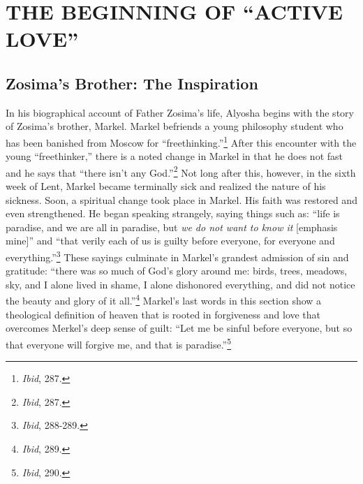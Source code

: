 \chapter{THE BEGINNING OF ``ACTIVE LOVE''}
\section{Zosima's Brother: The Inspiration}
In his biographical account of Father Zosima's life, Alyosha begins with the story of Zosima's brother, Markel. Markel befriends a young philosophy student who has been banished from Moscow for ``freethinking.''\footnote{\emph{Ibid}, 287.} After this encounter with the young ``freethinker,'' there is a noted change in Markel in that he does not fast and he says that ``there isn't any God.''\footnote{\emph{Ibid}, 287.} Not long after this, however, in the sixth week of Lent, Markel became terminally sick and realized the nature of his sickness. Soon, a spiritual change took place in Markel. His faith was restored and even strengthened. He began speaking strangely, saying things such as: ``life is paradise, and we are all in paradise, but \emph{we do not want to know it} [emphasis mine]'' and ``that verily each of us is guilty before everyone, for everyone and everything.''\footnote{\emph{Ibid}, 288-289.} These sayings culminate in Markel's grandest admission of sin and gratitude: ``there was so much of God's glory around me: birds, trees, meadows, sky, and I alone lived in shame, I alone dishonored everything, and did not notice the beauty and glory of it all.''\footnote{\emph{Ibid}, 289.} Markel's last words in this section show a theological definition of heaven that is rooted in forgiveness and love that overcomes Merkel's deep sense of guilt: ``Let me be sinful before everyone, but so that everyone will forgive me, and that is paradise.''\footnote{\emph{Ibid}, 290.}

